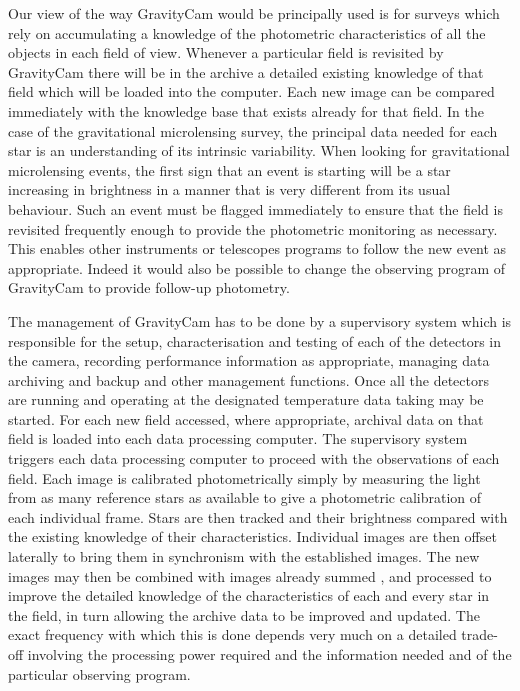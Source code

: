 \documentclass{pasa}%
\begin{document}
Our view of the way \mbox{GravityCam} would be principally used is for surveys which rely on accumulating a knowledge of the photometric characteristics of all the objects in each field of view.  Whenever a particular field is revisited by \mbox{GravityCam} there will be in the archive a detailed existing knowledge of that field which will be loaded into the computer.  Each new image can be compared immediately with the knowledge base that exists already for that field.  In the case of the gravitational microlensing survey, the principal data needed for each star is an understanding of its intrinsic variability.  When looking for gravitational microlensing events, the first sign that an event is starting will be a star increasing in brightness in a manner that is very different from its usual behaviour.  Such an event must be flagged immediately to ensure that the field is revisited frequently enough to provide the photometric monitoring as necessary.  This enables other instruments or telescopes programs to follow the new event as appropriate.  Indeed it would also be possible to change the observing  program of \mbox{GravityCam} to provide follow-up photometry.
 
 The management of \mbox{GravityCam} has to be done by a supervisory system which is responsible for  the setup, characterisation and testing of each of the detectors in the camera, recording performance information as appropriate, managing data archiving and backup and other management functions.  Once all the detectors are running and operating at the designated temperature data taking may be started.  For each new field accessed, where appropriate, archival data on that field is loaded into each data processing computer.  The supervisory system triggers each data processing computer to proceed with the observations of each field.  Each image is calibrated photometrically simply by measuring the light from as many reference stars as available to give a photometric calibration of each individual frame.  Stars are then tracked and their brightness compared with the existing knowledge of their characteristics.  Individual images are then offset laterally to bring them in synchronism with the established images.  The new images may then be combined with images already summed , and processed to improve the detailed knowledge of the characteristics of each and every star in the field, in turn allowing the archive data to be improved and updated.  The exact frequency with which this is done depends very much on a detailed trade-off involving the processing power required and the information needed and of the particular observing program.
 
\end{document}
